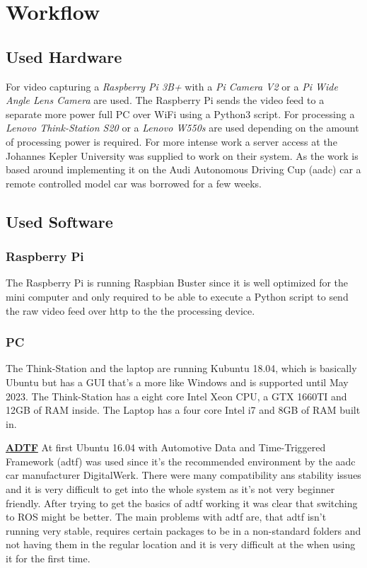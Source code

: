 \chapter{Workflow}


\section{Used Hardware\authorA}
For video capturing a \textit{Raspberry Pi 3B+} with a \textit{Pi Camera V2} or a \textit{Pi Wide Angle Lens Camera} are used. The Raspberry Pi sends the video feed to a separate more power full PC over WiFi using a Python3 script. \newline
For processing a \textit{Lenovo Think-Station S20} or a \textit{Lenovo W550s} are used depending on the amount of processing power is required. For more intense work a server access at the Johannes Kepler University was supplied to work on their system. \newline
As the work is based around implementing it on the Audi Autonomous Driving Cup (\gls{aadc}) car a remote controlled model car was borrowed for a few weeks.

\section{Used Software\authorA}
\subsection{Raspberry Pi}
The Raspberry Pi is running Raspbian Buster since it is well optimized for the mini computer and only required to be able to execute a Python script to send the raw video feed over http to the the processing device.\newline
\subsection{PC}
The Think-Station and the laptop are running Kubuntu 18.04, which is basically Ubuntu but has a GUI that's a more like Windows and is supported until May 2023. \newline
The Think-Station has a eight core Intel Xeon CPU, a GTX 1660TI and 12GB of RAM inside. \newline
The Laptop has a four core Intel i7 and 8GB of RAM built in.\newline

\textbf{\underline{ADTF}} \newline
At first Ubuntu 16.04 with Automotive Data and Time-Triggered Framework (\gls{adtf}) was used since it's the recommended environment by the \gls{aadc} car manufacturer DigitalWerk. There were many compatibility ans stability issues and it is very difficult to get into the whole system as it's not very beginner friendly. After trying to get the basics of \gls{adtf} working it was clear that switching to ROS might be better. The main problems with \gls{adtf} are, that \gls{adtf} isn't running very stable, requires certain packages to be in a non-standard folders and not having them in the regular location and it is very difficult at the when using it for the first time.

